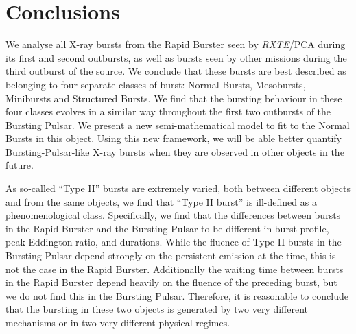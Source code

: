 \section{Conclusions}

\par We analyse all X-ray bursts from the Rapid Burster seen by \textit{RXTE}/PCA during its first and second outbursts, as well as bursts seen by other missions during the third outburst of the source.  We conclude that these bursts are best described as belonging to four separate classes of burst: Normal Bursts, Mesobursts, Minibursts and Structured Bursts.  We find that the bursting behaviour in these four classes evolves in a similar way throughout the first two outbursts of the Bursting Pulsar.  We present a new semi-mathematical model to fit to the Normal Bursts in this object.  Using this new framework, we will be able better quantify Bursting-Pulsar-like X-ray bursts when they are observed in other objects in the future.
\par As so-called ``Type II'' bursts are extremely varied, both between different objects and from the same objects, we find that ``Type II burst'' is ill-defined as a phenomenological class.  Specifically, we find that the differences between bursts in the Rapid Burster and the Bursting Pulsar to be different in burst profile, peak Eddington ratio, and durations.  While the fluence of Type II bursts in the Bursting Pulsar depend strongly on the persistent emission at the time, this is not the case in the Rapid Burster.  Additionally the waiting time between bursts in the Rapid Burster depend heavily on the fluence of the preceding burst, but we do not find this in the Bursting Pulsar.  Therefore, it is reasonable to conclude that the bursting in these two objects is generated by two very different mechanisms or in two very different physical regimes.